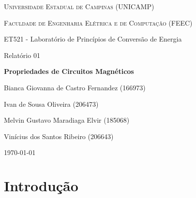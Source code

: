 \documentclass[12pt, a4paper, notitlepage]{article}
\begin{document}
    
    \def\figscale{0.8}
    
    
    \begin{titlepage}
    
        \centering
    
        {\Large \textsc{Universidade Estadual de Campinas (UNICAMP)}\par}
        \vspace{1.5cm}
        {\large \textsc{Faculdade de Engenharia Elétrica e de Computação (FEEC)}\par}
        \vspace{3cm}
        {\large ET521 - Laboratório de Princípios de Conversão de Energia\par}
        \vspace{0.5cm}
        {\large Relatório 01\par}
        \vspace{3cm}
        {\LARGE \bfseries{Propriedades de Circuitos Magnéticos}\par}
        \vspace{3cm}
        Bianca Giovanna de Castro Fernandez (166973) \par\par
        Ivan de Sousa Oliveira (206473) \par\par
        Melvin Gustavo Maradiaga Elvir (185068) \par\par
        Vinícius dos Santos Ribeiro (206643)
        \vfill
    
        {\large \today\par}
        
    \end{titlepage}
    
    \newpage
        
        \section{Introdução}
        
\end{document}
